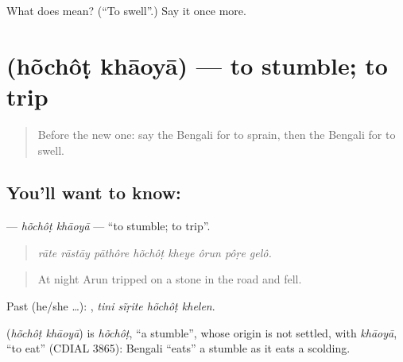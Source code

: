 \begin{tcolorbox}[breakable,colback=teal!4,colframe=teal!35!black,title={Before you move on}]
What does  mean? (\textquotedblleft{}To swell\textquotedblright{}.) Say it once more.
\end{tcolorbox}
\section[\texorpdfstring{\bn{হোঁচট} \bn{খাওয়া} (hõchôṭ khāoyā)}{হোঁচট খাওয়া (hõchôṭ khāoyā)}]{  (hõchôṭ khāoyā) — to stumble; to trip}

\label{lesson:BN-C475-hochot-khaoya}



\begin{quote}
Before the new one: say the Bengali for to sprain, then the Bengali for to swell.
\end{quote}

\subsection*{You'll want to know:  }
\textbf{ } — \emph{hõchôṭ khāoyā} — \textquotedblleft{}to stumble; to trip\textquotedblright{}.

\begin{quote}
       
\end{quote}

\begin{quote}
\emph{rāte rāstāy pāthôre hõchôṭ kheye ôrun pôṛe gelô.}
\end{quote}

\begin{quote}
At night Arun tripped on a stone in the road and fell.
\end{quote}

Past (he/she …):    , \emph{tini sĩṛite hõchôṭ khelen}.

\begin{cousinweb}
\textbf{ } (\emph{hõchôṭ khāoyā}) is \emph{hõchôṭ}, \textquotedblleft{}a stumble\textquotedblright{}, whose origin is not settled, with \emph{khāoyā}, \textquotedblleft{}to eat\textquotedblright{} (CDIAL 3865): Bengali \textquotedblleft{}eats\textquotedblright{} a stumble as it eats a scolding.
\end{cousinweb}

